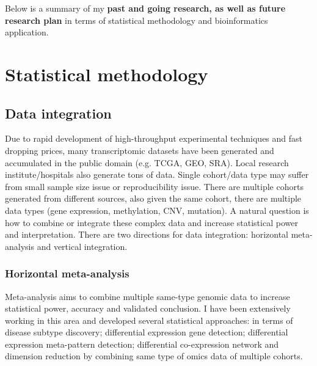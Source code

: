\documentclass[a4paper, 10pt]{article}
\begin{document}
Below is a summary of my \textbf{past and going research, as well as future research plan} in terms of statistical methodology and bioinformatics application.


\section{Statistical methodology}


\subsection{Data integration}

Due to rapid development of high-throughput experimental techniques and fast dropping prices, many transcriptomic datasets have
been generated and accumulated in the public domain (e.g. TCGA, GEO, SRA).
Local research institute/hospitals also generate tons of data.
Single cohort/data type may suffer from small sample size issue or reproducibility issue.
There are multiple cohorts generated from different sources, 
also given the same cohort, there are multiple data types (gene expression, methylation, CNV, mutation).
A natural question is how to combine or integrate these complex data and increase statistical power and interpretation.
There are two directions for data integration: horizontal meta-analysis and vertical integration.

\subsubsection{Horizontal meta-analysis }

Meta-analysis aims to combine multiple same-type genomic data to increase statistical power, accuracy and validated conclusion.
I have been extensively working in this area and developed several statistical approaches:
in terms of disease subtype discovery; differential expression gene detection; differential expression meta-pattern detection;
differential co-expression network and dimension reduction by combining same type of omics data of multiple cohorts.
\end{document}
